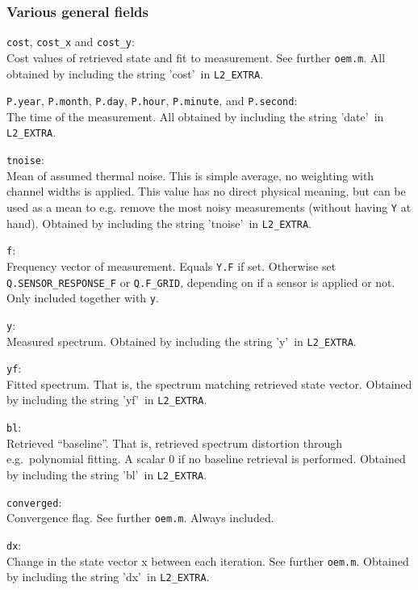 \documentclass[a4paper,11pt]{article}
\newcommand{\newfield}{\vspace{1ex}\noindent}
\begin{document}
\subsubsection{Various general fields}
%
\newfield 
\verb|cost|, \verb|cost_x| and \verb|cost_y|:\\
Cost values of retrieved state and fit to measurement. See further \verb|oem.m|.
All obtained by including the string \rq cost\rq\ in \verb|L2_EXTRA|.

\newfield 
\verb|P.year|, \verb|P.month|, \verb|P.day|, \verb|P.hour|, \verb|P.minute|,
and \verb|P.second|:\\
The time of the measurement. 
All obtained by including the string \rq date\rq\ in \verb|L2_EXTRA|.

\newfield 
\verb|tnoise|:\\
Mean of assumed thermal noise. This is simple average, no weighting
with channel widths is applied. This value has no direct physical
meaning, but can be used as a mean to e.g. remove the most noisy
measurements (without having \verb|Y| at hand). 
Obtained by including the  string \rq tnoise\rq\ in \verb|L2_EXTRA|.

\newfield 
\verb|f|:\\
Frequency vector of measurement. Equals \verb|Y.F| if set. Otherwise
set \verb|Q.SENSOR_RESPONSE_F| or \verb|Q.F_GRID|, depending on if a sensor is
applied or not. Only included together with \verb|y|.

\newfield 
\verb|y|:\\
Measured spectrum. 
Obtained by including the string \rq y\rq\ in \verb|L2_EXTRA|.

\newfield 
\verb|yf|:\\
Fitted spectrum. That is, the spectrum matching retrieved state vector.
Obtained by including the string \rq yf\rq\ in \verb|L2_EXTRA|.

\newfield
\verb|bl|:\\
Retrieved ``baseline''. That is, retrieved spectrum distortion through
e.g.\ polynomial fitting. A scalar 0 if no baseline retrieval is performed.
Obtained by including the string \rq bl\rq\ in \verb|L2_EXTRA|.

\newfield 
\verb|converged|:\\
Convergence flag. See further \verb|oem.m|. Always included.

\newfield 
\verb|dx|:\\
Change in the state vector x between each iteration. See further \verb|oem.m|.
Obtained by including the string \rq dx\rq\ in \verb|L2_EXTRA|.
\end{document}
